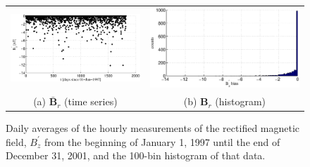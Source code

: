 \documentclass{article}[10pt]
\begin{document}
\begin{figure}[ht]
\begin{tabular}{cc}
\includegraphics[scale=0.48]{SolarExample_Bzdailyrec.eps} & \includegraphics[scale=0.48]{SolarExample_Bzdailyrechist.eps} \\
(a) $\bar{\mathbf{B}}_r$ (time series) & (b) $\mathbf{\mathbf{B}}_r$ (histogram)
\end{tabular}
\caption{Daily averages of the hourly measurements of the rectified magnetic field, $B_z^\prime$ from the beginning of January 1, 1997 until the end of December 31, 2001, and the 100-bin histogram of that data.}
\label{fig:BzDstDAILYrecxyplot}
\end{figure}
\end{document}
